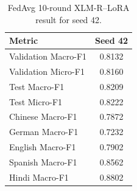 \begin{table}[t]
\centering
\caption{FedAvg 10-round XLM-R--LoRA result for seed 42.}
\label{tab:fedavg10r_seed42}
\begin{tabular}{lc}
\hline
Metric & Seed 42 \\
\hline
Validation Macro-F1 & 0.8132 \\
Validation Micro-F1 & 0.8160 \\
Test Macro-F1 & 0.8209 \\
Test Micro-F1 & 0.8222 \\
\hline
Chinese Macro-F1 & 0.7872 \\
German Macro-F1 & 0.7232 \\
English Macro-F1 & 0.7902 \\
Spanish Macro-F1 & 0.8562 \\
Hindi Macro-F1 & 0.8802 \\
\hline
\end{tabular}
\end{table}
